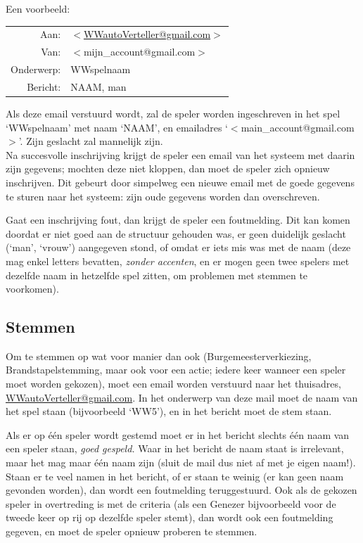 \documentclass[12pt]{article}
\begin{document}
    Een voorbeeld:
    
    \begin{center}
      \begin{tabularx}{0.75\textwidth}[c]{|r X|}
	\hline
	Aan: & \href{mailto:<WWautoVerteller@gmail.com>}{$<$WWautoVerteller@gmail.com$>$} \\
	Van: & $<$mijn\_account@gmail.com$>$ \\
	Onderwerp: & WWspelnaam \\[\baselineskip]	
	Bericht: & NAAM, man \\  
	\hline
      \end{tabularx}
    \end{center}
    
    Als deze email verstuurd wordt, zal de speler worden ingeschreven in het spel `WWspelnaam' met naam `NAAM', en emailadres `$<$main\_account@gmail.com$>$'. Zijn geslacht zal mannelijk zijn.
    \\[\baselineskip]
    Na succesvolle inschrijving krijgt de speler een email van het systeem met daarin zijn gegevens; mochten deze niet kloppen, dan moet de speler zich opnieuw inschrijven. Dit gebeurt door simpelweg een nieuwe email met de goede gegevens te sturen naar het systeem: zijn oude gegevens worden dan overschreven.
    
    Gaat een inschrijving fout, dan krijgt de speler een foutmelding. Dit kan komen doordat er niet goed aan de structuur gehouden was, er geen duidelijk geslacht (`man', `vrouw') aangegeven stond, of omdat er iets mis was met de naam (deze mag enkel letters bevatten, \emph{zonder accenten}, en er mogen geen twee spelers met dezelfde naam in hetzelfde spel zitten, om problemen met stemmen te voorkomen).

  \subsection{Stemmen}
  
    Om te stemmen op wat voor manier dan ook (Burgemeesterverkiezing, Brandstapelstemming, maar ook voor een actie; iedere keer wanneer een speler moet worden gekozen), moet een email worden verstuurd naar het thuisadres, \href{mailto:<WWautoVerteller@gmail.com>}{WWautoVerteller@gmail.com}. In het onderwerp van deze mail moet de naam van het spel staan (bijvoorbeeld `WW5'), en in het bericht moet de stem staan. 
    
    Als er op \'e\'en speler wordt gestemd moet er in het bericht slechts \'e\'en naam van een speler staan, \emph{goed gespeld.} Waar in het bericht de naam staat is irrelevant, maar het mag maar \'e\'en naam zijn (sluit de mail dus niet af met je eigen naam!). Staan er te veel namen in het bericht, of er staan te weinig (er kan geen naam gevonden worden), dan wordt een foutmelding teruggestuurd. Ook als de gekozen speler in overtreding is met de criteria (als een Genezer bijvoorbeeld voor de tweede keer op rij op dezelfde speler stemt), dan wordt ook een foutmelding gegeven, en moet de speler opnieuw proberen te stemmen.
    
\end{document}
